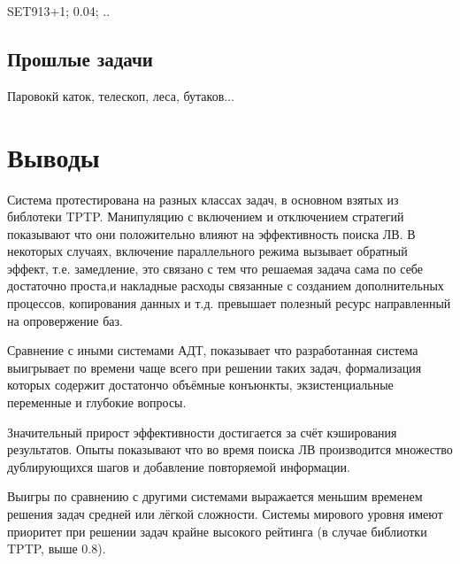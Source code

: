 SET913+1; 0.04; ..

\subsection{Прошлые задачи}

Паровокй каток, телескоп, леса, бутаков...

\section{Выводы}
Система протестирована на разных классах задач, в основном взятых из библотеки TPTP. Манипуляцию с включением и отключением стратегий показывают что они положительно влияют на эффективность поиска ЛВ. В некоторых случаях, включение параллельного режима вызывает обратный эффект, т.е. замедление, это связано с тем что решаемая задача сама по себе достаточно проста,и  накладные расходы связанные с созданием дополнительных процессов, копирования данных и т.д. превышает полезный ресурс направленный на опровержение баз. 

Сравнение с иными системами АДТ, показывает что разработанная система выигрывает по времени чаще всего при решении таких задач, формализация которых содержит достатончо объёмные конъюнкты, экзистенциальные переменные и глубокие вопросы. 

Значительный прирост эффективности достигается за счёт кэширования результатов. Опыты показывают что во время поиска ЛВ производится множество дублирующихся шагов и добавление повторяемой информации.

Выигры по сравнению с другими системами выражается меньшим временем решения задач средней или лёгкой сложности. Системы мирового уровня имеют приоритет при решении задач крайне высокого рейтинга (в случае библиотки TPTP, выше 0.8).  



